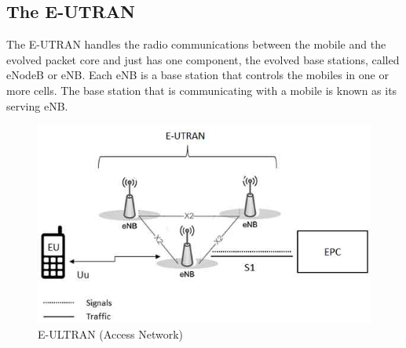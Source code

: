 \subsection{The E-UTRAN }
{
    The E-UTRAN handles the radio communications between the mobile 
    and the evolved packet core and just has one component, the evolved 
    base stations, called eNodeB or eNB. Each eNB is a base station 
    that controls the mobiles in one or more cells. The base station 
    that is communicating with a mobile is known as its serving eNB.

    \begin{figure}[ht]
        \centering
        \includegraphics[scale=0.5]{img/ultran.jpg}
        \caption{E-ULTRAN (Access Network)}
    \end{figure}
}

